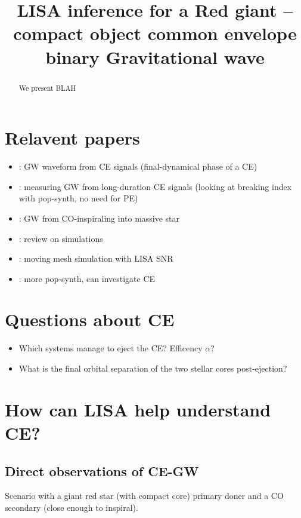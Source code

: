 \documentclass[floatfix,ApJL, twocolumn]{aastex631}
\begin{document}
\title{LISA inference for a Red giant -- compact object common envelope binary Gravitational wave}







\begin{abstract}
We present BLAH
\end{abstract}




\section{Relavent papers} 
\begin{itemize}
    \item \cite{Ginat:2020:MNRAS}: GW waveform from CE signals (final-dynamical phase of a CE)
    \item \cite{Renzo:2021:ApJ}: measuring GW from long-duration CE signals (looking at breaking index with pop-synth, no need for PE)
    \item \cite{Raveh:2021:MNRAS}: GW from CO-inspiraling into massive star
    \item \cite{Roepke:2022:arXiv}: review on simulations 
    \item \cite{Ohlmann:2016:ApJL}: moving mesh simulation with LISA SNR
    \item \cite{Wagg:2022:ApJ}: more pop-synth, can investigate CE 
\end{itemize}


\section{Questions about CE}
\begin{itemize}
    \item Which systems manage to eject the CE? Efficency $\alpha$? 
    \item What is the final orbital separation of the two stellar cores post-ejection?
\end{itemize}


\section{How can LISA help understand CE?}
\subsection{Direct observations of CE-GW}
Scenario with a giant red star (with compact core) primary doner and a CO secondary (close enough to inspiral).
\end{document}
